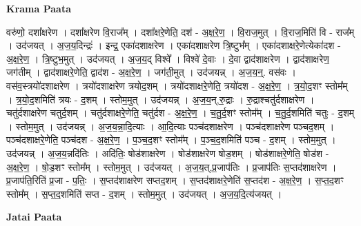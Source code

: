 \documentclass[17pt]{extarticle}
\begin{document}
\textbf{Krama Paata} \newline

वरु॑णो॒ दशा᳚क्षरेण । दशा᳚क्षरेण वि॒राज᳚म् । दशा᳚क्षरे॒णेति॒ दश॑ - अ॒क्ष॒रे॒ण॒ । वि॒राज॒मुत् । वि॒राज॒मिति॑ वि - राज᳚म् । उद॑जयत् । अ॒ज॒य॒दिन्द्रः॑ । इन्द्र॒ एका॑दशाक्षरेण । एका॑दशाक्षरेण त्रि॒ष्टुभ᳚म् । एका॑दशाक्षरे॒णेत्येका॑दश - अ॒क्ष॒रे॒ण॒ । त्रि॒ष्टुभ॒मुत् । उद॑जयत् । अ॒ज॒य॒द् विश्वे᳚ । विश्वे॑ दे॒वाः । दे॒वा द्वाद॑शाक्षरेण । द्वाद॑शाक्षरेण॒ जग॑तीम् । द्वाद॑शाक्षरे॒णेति॒ द्वाद॑श - अ॒क्ष॒रे॒ण॒ । जग॑ती॒मुत् । उद॑जयन्न् । अ॒ज॒य॒न्॒. वस॑वः । वस॑व॒स्त्रयो॑दशाक्षरेण । त्रयो॑दशाक्षरेण त्रयोद॒शम् । त्रयो॑दशाक्षरे॒णेति॒ त्रयो॑दश - अ॒क्ष॒रे॒ण॒ । त्र॒यो॒द॒शꣳ स्तोम᳚म् । त्र॒यो॒द॒शमिति॑ त्रयः - द॒शम् । स्तोम॒मुत् । उद॑जयन्न् । अ॒ज॒य॒न्,रु॒द्राः । रु॒द्राश्चतु॑र्दशाक्षरेण । चतु॑र्दशाक्षरेण चतुर्द॒शम् । चतु॑र्दशाक्षरे॒णेति॒ चतु॑र्दश - अ॒क्ष॒रे॒ण॒ । च॒तु॒र्द॒शꣳ स्तोम᳚म् । च॒तु॒र्द॒शमिति॑ चतुः - द॒शम् । स्तोम॒मुत् । उद॑जयन्न् । अ॒ज॒य॒न्ना॒दि॒त्याः । आ॒दि॒त्याः पञ्च॑दशाक्षरेण । पञ्च॑दशाक्षरेण पञ्चद॒शम् । पञ्च॑दशाक्षरे॒णेति॒ पञ्च॑दश - अ॒क्ष॒रे॒ण॒ । प॒ञ्च॒द॒शꣳ स्तोम᳚म् । प॒ञ्च॒द॒शमिति॑ पञ्च - द॒शम् । स्तोम॒मुत् । उद॑जयन्न् । अ॒ज॒य॒न्नदि॑तिः । अदि॑तिः॒ षोड॑शाक्षरेण । षोड॑शाक्षरेण षोड॒शम् । षोड॑शाक्षरे॒णेति॒ षोड॑श - अ॒क्ष॒रे॒ण॒ । षो॒ड॒शꣳ स्तोम᳚म् । स्तोम॒मुत् । उद॑जयत् । अ॒ज॒य॒त्,प्र॒जाप॑तिः । प्र॒जाप॑तिः स॒प्तद॑शाक्षरेण । प्र॒जाप॑ति॒रिति॑ प्र॒जा - प॒तिः॒ । स॒प्तद॑शाक्षरेण सप्तद॒शम् । स॒प्तद॑शाक्षरे॒णेति॑ स॒प्तद॑श - अ॒क्ष॒रे॒ण॒ । स॒प्त॒द॒शꣳ स्तोम᳚म् । स॒प्त॒द॒शमिति॑ सप्त - द॒शम् । स्तोम॒मुत् । उद॑जयत् । अ॒ज॒य॒दि॒त्य॑जयत् । \newline

\textbf{Jatai Paata} \newline
\end{document}
